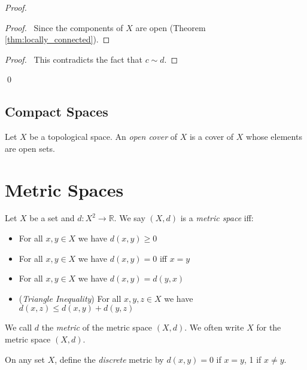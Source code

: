 \begin{proof}
\pf
{}
\begin{proof}
	\pf\ Since the components of $X$ are open (Theorem \ref{thm:locally_connected}).
\end{proof}
\qedstep
\begin{proof}
	\pf\ This contradicts the fact that $c \sim d$.
\end{proof}
\qed
\end{proof}

\section{Compact Spaces}

\begin{df}
Let $X$ be a topological space. An \emph{open cover} of $X$ is a cover of $X$ whose elements are open sets.
\end{df}

\chapter{Metric Spaces}

\begin{df}
Let $X$ be a set and $d : X^2 \rightarrow \mathbb{R}$. We say $(X,d)$ is a \emph{metric space} iff:
\begin{itemize}
\item For all $x,y \in X$ we have $d(x,y) \geq 0$
\item For all $x,y \in X$ we have $d(x,y) = 0$ iff $x = y$
\item For all $x,y \in X$ we have $d(x,y) = d(y,x)$
\item (\emph{Triangle Inequality}) For all $x,y,z \in X$ we have $d(x,z) \leq d(x,y) + d(y,z)$
\end{itemize}
We call $d$ the \emph{metric} of the metric space $(X,d)$. We often write $X$ for the metric space $(X,d)$.
\end{df}

\begin{df}
On any set $X$, define the \emph{discrete} metric by $d(x,y) = 0$ if $x = y$, 1 if $x \neq y$.
\end{df}

